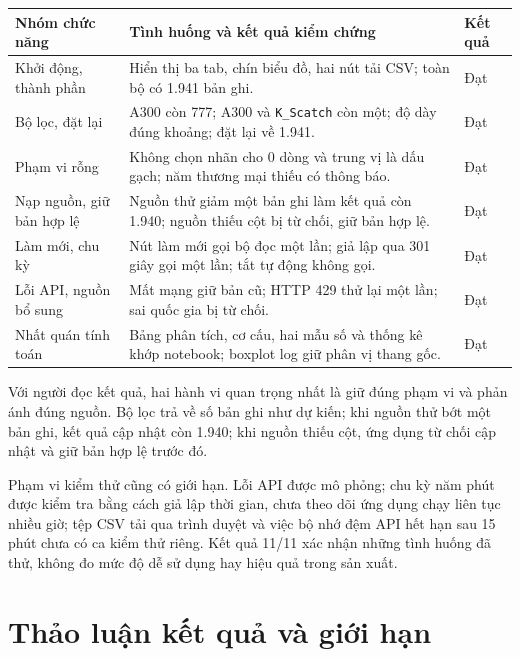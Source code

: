 \documentclass[12pt,a4paper,oneside]{report}
\newcommand{\maCot}[1]{{\urlstyle{tt}\def\UrlBreaks{\do\_\do\/\do\.}\def\UrlBigBreaks{}\nolinkurl{#1}}}
\begin{document}
\begin{center}\begin{minipage}{\linewidth}
\label{tab:ch4test}
\small{}
\begin{tabularx}{\linewidth}{@{}p{3.0cm}Y p{0.9cm}@{}}
\toprule
Nhóm chức năng & Tình huống và kết quả kiểm chứng & Kết quả \\
\midrule
Khởi động, thành phần & Hiển thị ba tab, chín biểu đồ, hai nút tải CSV; toàn bộ có 1.941 bản ghi. & Đạt \\
Bộ lọc, đặt lại & A300 còn 777; A300 và \maCot{K_Scatch} còn một; độ dày đúng khoảng; đặt lại về 1.941. & Đạt \\
Phạm vi rỗng & Không chọn nhãn cho 0 dòng và trung vị là dấu gạch; năm thương mại thiếu có thông báo. & Đạt \\
Nạp nguồn, giữ bản hợp lệ & Nguồn thử giảm một bản ghi làm kết quả còn 1.940; nguồn thiếu cột bị từ chối, giữ bản hợp lệ. & Đạt \\
Làm mới, chu kỳ & Nút làm mới gọi bộ đọc một lần; giả lập qua 301 giây gọi một lần; tắt tự động không gọi. & Đạt \\
Lỗi API, nguồn bổ sung & Mất mạng giữ bản cũ; HTTP 429 thử lại một lần; sai quốc gia bị từ chối. & Đạt \\
Nhất quán tính toán & Bảng phân tích, cơ cấu, hai mẫu số và thống kê khớp notebook; boxplot log giữ phân vị thang gốc. & Đạt \\
\bottomrule
\end{tabularx}
\end{minipage}\end{center}

Với người đọc kết quả, hai hành vi quan trọng nhất là giữ đúng phạm vi và phản ánh đúng nguồn. Bộ lọc trả về số bản ghi như dự kiến; khi nguồn thử bớt một bản ghi, kết quả cập nhật còn 1.940; khi nguồn thiếu cột, ứng dụng từ chối cập nhật và giữ bản hợp lệ trước đó.

Phạm vi kiểm thử cũng có giới hạn. Lỗi API được mô phỏng; chu kỳ năm phút được kiểm tra bằng cách giả lập thời gian, chưa theo dõi ứng dụng chạy liên tục nhiều giờ; tệp CSV tải qua trình duyệt và việc bộ nhớ đệm API hết hạn sau 15 phút chưa có ca kiểm thử riêng. Kết quả 11/11 xác nhận những tình huống đã thử, không đo mức độ dễ sử dụng hay hiệu quả trong sản xuất.

\section{Thảo luận kết quả và giới hạn}
\label{sec:ch4thaoluan}
\end{document}
